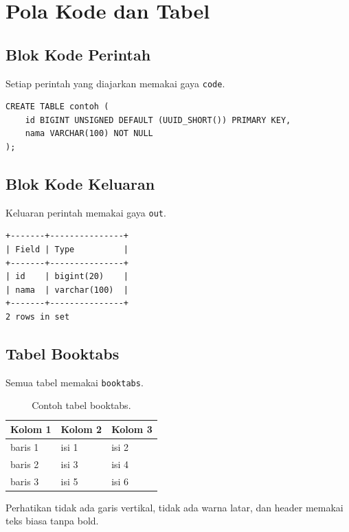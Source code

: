 \documentclass[11pt,a4paper]{article}
\begin{document}
\section{Pola Kode dan Tabel}

\subsection{Blok Kode Perintah}

Setiap perintah yang diajarkan memakai gaya \texttt{code}.

\begin{lstlisting}[style=code]
CREATE TABLE contoh (
    id BIGINT UNSIGNED DEFAULT (UUID_SHORT()) PRIMARY KEY,
    nama VARCHAR(100) NOT NULL
);
\end{lstlisting}

\subsection{Blok Kode Keluaran}

Keluaran perintah memakai gaya \texttt{out}.

\begin{lstlisting}[style=out]
+-------+---------------+
| Field | Type          |
+-------+---------------+
| id    | bigint(20)    |
| nama  | varchar(100)  |
+-------+---------------+
2 rows in set
\end{lstlisting}

\subsection{Tabel Booktabs}

Semua tabel memakai \texttt{booktabs}.

\begin{table}[H]
	\centering
	\caption{Contoh tabel booktabs.}
	\label{tab:example}
	\small
	\begin{tabular}{l l l}
		\toprule
		Kolom 1 & Kolom 2 & Kolom 3 \\
		\midrule
		baris 1 & isi 1   & isi 2   \\
		baris 2 & isi 3   & isi 4   \\
		baris 3 & isi 5   & isi 6   \\
		\bottomrule
	\end{tabular}
\end{table}

Perhatikan tidak ada garis vertikal, tidak ada warna latar, dan header memakai teks biasa tanpa bold.
\end{document}
